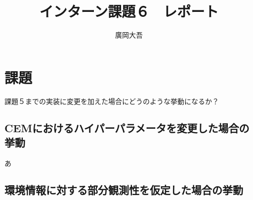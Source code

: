\documentclass{jsarticle}
\title{\vspace{-4cm}インターン課題６　レポート}
\author{廣岡大吾}
\begin{document}
\maketitle
\vspace{-1cm}
\section{課題}
課題５までの実装に変更を加えた場合にどうのような挙動になるか？
\subsection{CEMにおけるハイパーパラメータを変更した場合の挙動}
あ
\subsection{環境情報に対する部分観測性を仮定した場合の挙動}
\end{document}
